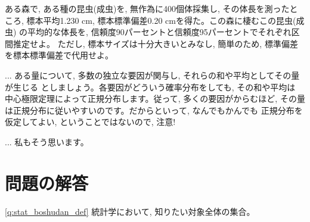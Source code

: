 \begin{q}\label{q:stat_kukansuitei01}
ある森で, ある種の昆虫(成虫)を, 無作為に400個体採集し, その体長を測ったところ, 
標本平均1.230 cm, 標本標準偏差0.20 cmを得た。この森に棲むこの昆虫(成虫)
の平均的な体長を, 信頼度90パーセントと信頼度95パーセントでそれぞれ区間推定せよ。
ただし, 標本サイズは十分大きいとみなし, 簡単のため, 標準偏差を標本標準偏差で代用せよ。
\end{q}\mv


\begin{faq}{\small{}
... ある量について, 多数の独立な要因が関与し, それらの和や平均としてその量が生じる
としましょう。各要因がどういう確率分布をしても, その和や平均は
中心極限定理によって正規分布します。従って, 多くの要因がからむほど, 
その量は正規分布に従いやすいのです。だからといって, なんでもかんでも
正規分布を仮定してよい, ということではないので, 注意!}\end{faq}

\begin{faq}{\small{}
... 私もそう思います。}\end{faq}

\vv


\section*{問題の解答}

\ref{q:stat_boshudan_def} 
統計学において, 知りたい対象全体の集合。
\mv

